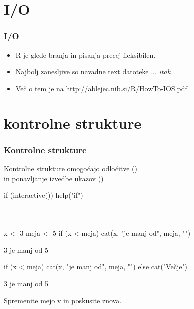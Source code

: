 \section{I/O}
\begin{frame}[fragile]
\frametitle{I/O }
\begin{itemize}
  \item R je glede branja in pisanja precej fleksibilen.
  \item Najbolj zanesljive so navadne text datoteke ... \emph{itak}
  \item Več o tem je na \url{http://ablejec.nib.si/R/HowTo-IOS.pdf}
\end{itemize}

\end{frame}
\section{kontrolne strukture}
\begin{frame}[fragile]
\frametitle{Kontrolne strukture}
Kontrolne strukture omogočajo odločitve ()\\%
in ponavljanje izvedbe ukazov ()
\begin{Schunk}
\begin{Sinput}
 if (interactive()) help("if")
\end{Sinput}
\end{Schunk}
\end{frame}

\begin{frame}[fragile]
\frametitle{}
\\
\begin{Schunk}
\begin{Sinput}
 x <- 3
 meja <- 5
 if (x < meja) cat(x, "je manj od", meja, "\n")
\end{Sinput}
\begin{Soutput}
3 je manj od 5 
\end{Soutput}
\begin{Sinput}
 if (x < meja) cat(x, "je manj od", meja, "\n") else cat("Večje\n")
\end{Sinput}
\begin{Soutput}
3 je manj od 5 
\end{Soutput}
\end{Schunk}
Spremenite mejo v  in poskusite znova.
\end{frame}

